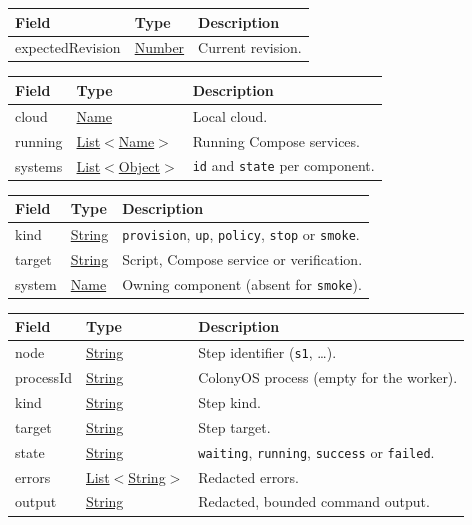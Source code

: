 \documentclass[a4paper]{arrowhead}
\newcommand{\pref}[1]{{\textcolor{ArrowheadGrey}{\hyperref[sec:model:primitives:#1]{#1}}}}
\begin{document}

\noindent\begin{tabularx}{\textwidth}{| >{\raggedright\arraybackslash}p{3.6cm} | >{\raggedright\arraybackslash\small}p{4.4cm} | X |} \hline
\rowcolor{gray!33} Field & Type & Description \\ \hline
expectedRevision & \pref{Number} & Current revision. \\ \hline
\end{tabularx}


\noindent\begin{tabularx}{\textwidth}{| >{\raggedright\arraybackslash}p{3.6cm} | >{\raggedright\arraybackslash\small}p{4.4cm} | X |} \hline
\rowcolor{gray!33} Field & Type & Description \\ \hline
cloud & \pref{Name} & Local cloud. \\ \hline
running & \pref{List}$<$\pref{Name}$>$ & Running Compose services. \\ \hline
systems & \pref{List}$<$\pref{Object}$>$ & \texttt{id} and \texttt{state} per component. \\ \hline
\end{tabularx}


\noindent\begin{tabularx}{\textwidth}{| >{\raggedright\arraybackslash}p{3.6cm} | >{\raggedright\arraybackslash\small}p{4.4cm} | X |} \hline
\rowcolor{gray!33} Field & Type & Description \\ \hline
kind & \pref{String} & \texttt{provision}, \texttt{up}, \texttt{policy}, \texttt{stop} or \texttt{smoke}. \\ \hline
target & \pref{String} & Script, Compose service or verification. \\ \hline
system & \pref{Name} & Owning component (absent for \texttt{smoke}). \\ \hline
\end{tabularx}


\noindent\begin{tabularx}{\textwidth}{| >{\raggedright\arraybackslash}p{3.6cm} | >{\raggedright\arraybackslash\small}p{4.4cm} | X |} \hline
\rowcolor{gray!33} Field & Type & Description \\ \hline
node & \pref{String} & Step identifier (\texttt{s1}, \ldots). \\ \hline
processId & \pref{String} & ColonyOS process (empty for the worker). \\ \hline
kind & \pref{String} & Step kind. \\ \hline
target & \pref{String} & Step target. \\ \hline
state & \pref{String} & \texttt{waiting}, \texttt{running}, \texttt{success} or \texttt{failed}. \\ \hline
errors & \pref{List}$<$\pref{String}$>$ & Redacted errors. \\ \hline
output & \pref{String} & Redacted, bounded command output. \\ \hline
\end{tabularx}
\end{document}

